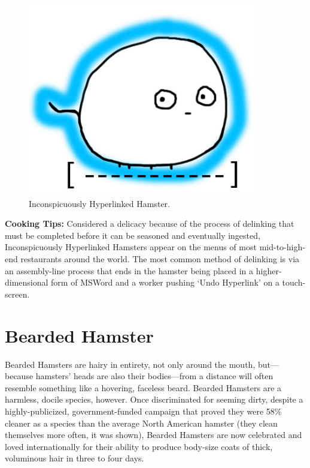 \documentclass[10pt,twoside,openright]{memoir}
\begin{document}
\begin{figure}[t!]                                                              
\begin{center}                                                                  
\includegraphics[width=0.9\textwidth]{img/hyperlinked}                         
\end{center}                                                                    
\caption*{Inconspicuously Hyperlinked Hamster.}                                               
\end{figure}

\noindent
\textbf{Cooking Tips:} Considered a delicacy because of the process of 
delinking that
must be completed before it can be seasoned and eventually ingested,
Inconspicuously Hyperlinked Hamsters appear on the menus of most mid-to-high-end
restaurants around the world. The most common method of delinking is via an
assembly-line process that ends in the hamster being placed in a
higher-dimensional form of MSWord and a worker pushing `Undo Hyperlink'
on a touch-screen.

\chapter*{Bearded Hamster}
Bearded Hamsters are hairy in entirety, not only around the mouth,
but---because hamsters' heads are also their bodies---from a distance
will often resemble something like a hovering, faceless beard. Bearded Hamsters
are a harmless, docile species, however. Once discriminated for seeming dirty,
despite a highly-publicized, government-funded campaign that proved they were
58\% cleaner as a species than the average North American hamster (they clean
themselves more often, it was shown), Bearded Hamsters are now celebrated and
loved internationally for their ability to produce body-size coats of thick,
voluminous hair in three to four days.
\end{document}
